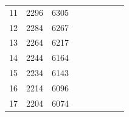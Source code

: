 \begin{enumerate}
\begin{table}[h!]
{\begin{tabular}{|rrr|rrrrrr}
					\multicolumn{1}{|r|}{11}    & \multicolumn{1}{r|}{2296}            & 6305                                                 &                      &                      &                       &                            &                                      &                                                      \\ \cline{1-3}
					\multicolumn{1}{|r|}{12}    & \multicolumn{1}{r|}{2284}            & 6267                                                 &                      &                      &                       &                            &                                      &                                                      \\ \cline{1-3}
					\multicolumn{1}{|r|}{13}    & \multicolumn{1}{r|}{2264}            & 6217                                                 &                      &                      &                       &                            &                                      &                                                      \\ \cline{1-3}
					\multicolumn{1}{|r|}{14}    & \multicolumn{1}{r|}{2244}            & 6164                                                 &                      &                      &                       &                            &                                      &                                                      \\ \cline{1-3}
					\multicolumn{1}{|r|}{15}    & \multicolumn{1}{r|}{2234}            & 6143                                                 &                      &                      &                       &                            &                                      &                                                      \\ \cline{1-3}
					\multicolumn{1}{|r|}{16}    & \multicolumn{1}{r|}{2214}            & 6096                                                 &                      &                      &                       &                            &                                      &                                                      \\ \cline{1-3}
					\multicolumn{1}{|r|}{17}    & \multicolumn{1}{r|}{2204}            & 6074                                                 &                      &                      &                       &                            &                                      &                                                      \\ \cline{1-3}

\end{tabular}}
\end{table}
\end{enumerate}
